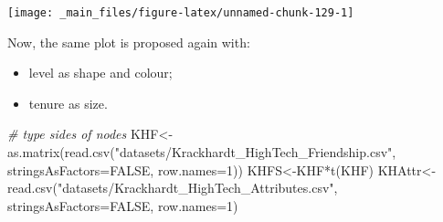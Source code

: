 \documentclass[
  notitlepage,
  onecolumn,
  openany]{book}
\newenvironment{Shaded}{\begin{snugshade}}{\end{snugshade}}
\newcommand{\AttributeTok}[1]{\textcolor[rgb]{0.77,0.63,0.00}{#1}}
\newcommand{\CommentTok}[1]{\textcolor[rgb]{0.56,0.35,0.01}{\textit{#1}}}
\newcommand{\ConstantTok}[1]{\textcolor[rgb]{0.00,0.00,0.00}{#1}}
\newcommand{\DecValTok}[1]{\textcolor[rgb]{0.00,0.00,0.81}{#1}}
\newcommand{\FunctionTok}[1]{\textcolor[rgb]{0.00,0.00,0.00}{#1}}
\newcommand{\NormalTok}[1]{#1}
\newcommand{\OtherTok}[1]{\textcolor[rgb]{0.56,0.35,0.01}{#1}}
\newcommand{\SpecialCharTok}[1]{\textcolor[rgb]{0.00,0.00,0.00}{#1}}
\newcommand{\StringTok}[1]{\textcolor[rgb]{0.31,0.60,0.02}{#1}}
\providecommand{\tightlist}{%
  \setlength{\itemsep}{0pt}\setlength{\parskip}{0pt}}
\begin{document}
\begin{center}\texttt{[image: \_main\_files/figure-latex/unnamed-chunk-129-1]} \end{center}

Now, the same plot is proposed again with:

\begin{itemize}
\tightlist
\item
  level as shape and colour;
\item
  tenure as size.
\end{itemize}

\begin{Shaded}
\begin{Highlighting}[]
\CommentTok{\# type sides of nodes}
\NormalTok{KHF}\OtherTok{\textless{}{-}}\FunctionTok{as.matrix}\NormalTok{(}\FunctionTok{read.csv}\NormalTok{(}\StringTok{"datasets/Krackhardt\_HighTech\_Friendship.csv"}\NormalTok{,}
                        \AttributeTok{stringsAsFactors=}\ConstantTok{FALSE}\NormalTok{, }\AttributeTok{row.names=}\DecValTok{1}\NormalTok{))}
\NormalTok{KHFS}\OtherTok{\textless{}{-}}\NormalTok{KHF}\SpecialCharTok{*}\FunctionTok{t}\NormalTok{(KHF)}
\NormalTok{KHAttr}\OtherTok{\textless{}{-}}\FunctionTok{read.csv}\NormalTok{(}\StringTok{"datasets/Krackhardt\_HighTech\_Attributes.csv"}\NormalTok{,}
                 \AttributeTok{stringsAsFactors=}\ConstantTok{FALSE}\NormalTok{, }\AttributeTok{row.names=}\DecValTok{1}\NormalTok{)}


\end{Highlighting}
\end{Shaded}
\end{document}
